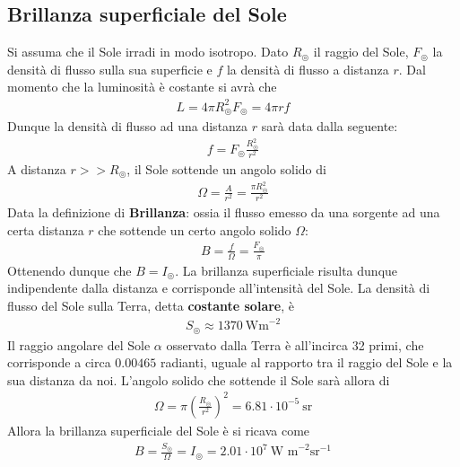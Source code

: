 \documentclass[a4paper, oneside]{book}
\begin{document}
\subsection{Brillanza superficiale del Sole}
Si assuma che il Sole irradi in modo isotropo. Dato $R_\circledcirc$ il raggio 
del Sole, $F_\circledcirc$ la densità di flusso sulla sua superficie
e $f$ la densità di flusso a distanza $r$. Dal momento che la luminosità 
è costante si avrà che 
\begin{gather*}
    L = 4\pi R_\circledcirc^{2} F_\circledcirc = 4\pi r f
\end{gather*}
Dunque la densità di flusso ad una distanza $r$ sarà data dalla seguente:
\begin{gather*}
    f = F_\circledcirc \frac{R_\circledcirc^{2}}{r^{2}}
\end{gather*}
A distanza $r >> R_\circledcirc$, il Sole sottende un angolo solido di 
\begin{gather*}
    \Omega = \frac{A}{r^{2}} = \frac{\pi R_\circledcirc ^{2}}{r^{2}}
\end{gather*}
Data la definizione di \textbf{Brillanza}: ossia il flusso emesso da 
una sorgente ad una certa distanza $r$ che sottende un certo angolo solido $\Omega$:
\begin{align}
    B = \frac{f}{\Omega} = \frac{F_\circledcirc}{\pi}
\end{align}
Ottenendo dunque che $B = I_\circledcirc$.  La brillanza superficiale risulta dunque 
indipendente dalla distanza e corrisponde all'intensità del Sole. La densità di flusso 
del Sole sulla Terra, detta \textbf{costante solare}, è 
\begin{gather*}
    S_\circledcirc \approx 1370 \ \text{Wm}^{-2} 
\end{gather*}
Il raggio angolare del Sole $\alpha$ osservato dalla Terra è all'incirca 32 primi, 
che corrisponde a circa $0.00465$ radianti, uguale al rapporto tra il raggio del Sole e la 
sua distanza da noi. L'angolo solido che sottende il Sole sarà allora di 
\begin{gather*}
    \Omega = \pi \left(\frac{R_\circledcirc}{r^{2}}\right)^{2} = 6.81 \cdot 10^{-5} \ \text{sr}
\end{gather*}
Allora la brillanza superficiale del Sole è si ricava come
\begin{gather*}
    B = \frac{S_\circledcirc}{\Omega} = I_\circledcirc = 2.01 \cdot 10^{7} \ \text{W m}^{-2} \text{sr}^{-1}
\end{gather*}
\end{document}
